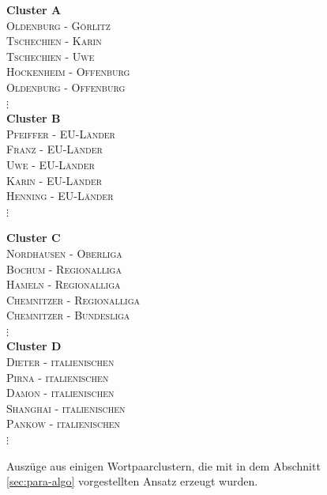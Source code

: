 \begin{figure}[h]
  \centering
  \begin{multicols}{2}
    \textbf{Cluster A}\\
    \textsc{Oldenburg} - \textsc{Görlitz}\\
    \textsc{Tschechien} - \textsc{Karin}\\
    \textsc{Tschechien} - \textsc{Uwe}\\
    \textsc{Hockenheim} - \textsc{Offenburg}\\
    \textsc{Oldenburg} - \textsc{Offenburg}\\
    $\vdots$\\
    \columnbreak
    \textbf{Cluster B}\\
    \textsc{Pfeiffer} - \textsc{EU-Länder}\\
    \textsc{Franz} - \textsc{EU-Länder}\\
    \textsc{Uwe} - \textsc{EU-Länder}\\
    \textsc{Karin} - \textsc{EU-Länder}\\
    \textsc{Henning} - \textsc{EU-Länder}\\
    $\vdots$\\
  \end{multicols}
  \begin{multicols}{2}
    \textbf{Cluster C}\\
    \textsc{Nordhausen} - \textsc{Oberliga}\\
    \textsc{Bochum} - \textsc{Regionalliga}\\
    \textsc{Hameln} - \textsc{Regionalliga}\\
    \textsc{Chemnitzer} - \textsc{Regionalliga}\\
    \textsc{Chemnitzer} - \textsc{Bundesliga}\\
    $\vdots$\\
    \columnbreak
    \textbf{Cluster D}\\
    \textsc{Dieter} - \textsc{italienischen}\\
    \textsc{Pirna} - \textsc{italienischen}\\
    \textsc{Damon} - \textsc{italienischen}\\
    \textsc{Shanghai} - \textsc{italienischen}\\
    \textsc{Pankow} - \textsc{italienischen}\\
    $\vdots$\\
  \end{multicols}
  \caption[Auszug aus verschiedenen Wortpaarclustern]{Auszüge aus einigen Wortpaarclustern, die mit in dem Abschnitt
  \ref{sec:para-algo} vorgestellten Ansatz erzeugt wurden.\label{fig:clusters}}
\end{figure}


